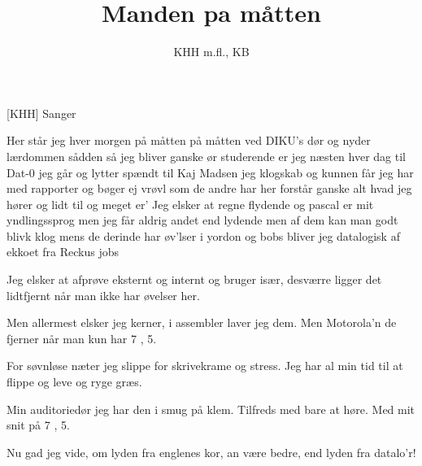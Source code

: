 \documentclass[a4paper,11pt]{article}
\title{Manden pa måtten}
\author{KHH m.fl., KB}
\begin{document}
\maketitle

\begin{roles}
[KHH] Sanger

\end{roles}


\begin{song}
%
Her står jeg hver morgen på måtten
på måtten ved DIKU's dør
og nyder lærdommen sådden
så jeg bliver ganske ør
studerende er jeg næsten
hver dag til Dat-0 jeg går
og lytter spændt til Kaj Madsen
jeg klogskab og kunnen får
jeg har med rapporter og bøger
ej vrøvl som de andre har her
forstår ganske alt hvad jeg hører
og lidt til og meget er'
Jeg elsker at regne flydende
og pascal er mit yndlingssprog
men jeg får aldrig andet end lydende
men af dem kan man godt blivk klog
mens de derinde har øv'lser i yordon og bobs
bliver jeg datalogisk af ekkoet fra Reckus jobs

Jeg elsker at afprøve eksternt
og internt og bruger især,
desværre ligger det lidtfjernt
når man ikke har øvelser her.

Men allermest elsker jeg kerner,
i assembler laver jeg dem.
Men Motorola'n de fjerner
når man kun har 7 , 5.

For søvnløse næter jeg slippe
for skrivekrame og stress.
Jeg har al min tid til at flippe
og leve og ryge græs.

Min auditoriedør
jeg har den i smug på klem.
Tilfreds med bare at høre.
Med mit snit på 7 , 5.

Nu gad jeg vide, om lyden fra englenes kor,
an være bedre, end lyden fra datalo'r!
\end{song}
\end{document}
